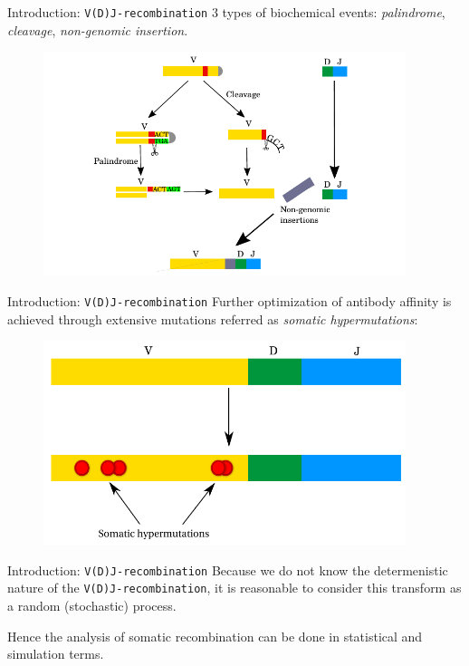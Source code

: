 \documentclass{beamer}\usepackage[]{graphicx}\usepackage[]{color}
\begin{document}
\begin{frame}{Introduction: \texttt{V(D)J-recombination}}
  3 types of biochemical events: \textit{palindrome}, \textit{cleavage}, \textit{non-genomic insertion}. 
  \begin{figure}[h]
    \center\includegraphics[width=300pt]{Pictures/vdj3_DJ_aligned.pdf}
 \end{figure}
\end{frame}

\begin{frame}{Introduction: \texttt{V(D)J-recombination}}
  Further optimization of antibody affinity is achieved through extensive mutations referred as \textit{somatic hypermutations}:
  \begin{figure}[h]
    \center\includegraphics[width=300pt]{Pictures/somatic_mutations.pdf}
 \end{figure}
\end{frame}

\begin{frame}{Introduction: \texttt{V(D)J-recombination}}
  Because we do not know the determenistic nature of the \texttt{V(D)J-recombination}, it is reasonable
  to consider this transform as a {\color{blue} random} (stochastic) process.

  \bigskip
  Hence the analysis of somatic recombination can be done in statistical and simulation terms. 
\end{frame}
\end{document}
